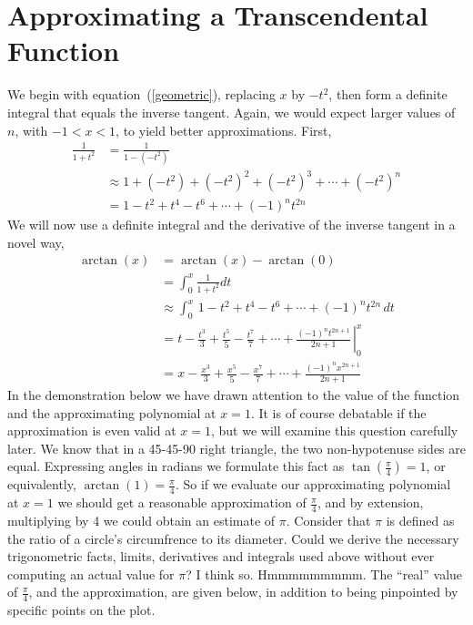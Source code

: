 \documentclass[12pt]{article}
\begin{document}
\section{Approximating a Transcendental Function}
%
We begin with equation~(\ref{geometric}), replacing $x$ by $-t^2$, then form a definite integral that equals the inverse tangent.  Again, we would expect larger values of $n$, with $-1<x<1$, to yield better approximations.  First,
%
\begin{align*}
\frac{1}{1+t^2}
&=\frac{1}{1-(-t^2)}\\
&\approx 1+(-t^2)+(-t^2)^2+(-t^2)^3+\cdots+(-t^2)^n\\
&=1-t^2+t^4-t^6+\cdots+(-1)^{n}t^{2n}
\end{align*}
%
We will now use a definite integral and the derivative of the inverse tangent in a novel way,
%
\begin{align*}
\arctan(x)
&=\arctan(x)-\arctan(0)\\
&=\int_0^x\frac{1}{1+t^2}dt\\
&\approx\int_0^x\,1-t^2+t^4-t^6+\cdots+(-1)^{n}t^{2n}\,dt\\
&=\left.t-\frac{t^3}{3}+\frac{t^5}{5}-\frac{t^7}{7}+\cdots+\frac{(-1)^{n}t^{2n+1}}{2n+1}\,\right\vert_0^x\\
&=x-\frac{x^3}{3}+\frac{x^5}{5}-\frac{x^7}{7}+\cdots+\frac{(-1)^{n}x^{2n+1}}{2n+1}
\end{align*}
%
In the demonstration below we have drawn attention to the value of the function and the approximating polynomial at $x=1$.  It is of course debatable if the approximation is even valid at $x=1$, but we will examine this question carefully later.  We know that in a 45-45-90 right triangle, the two non-hypotenuse sides are equal.  Expressing angles in radians we formulate this fact as $\tan\left(\frac{\pi}{4}\right)=1$, or equivalently, $\arctan(1)=\frac{\pi}{4}$.  So if we evaluate our approximating polynomial at $x=1$ we should get a reasonable approximation of $\frac{\pi}{4}$, and by extension, multiplying by 4 we could obtain an estimate of $\pi$.  Consider that $\pi$ is defined as the ratio of a circle's circumfrence to its diameter.  Could we derive the necessary trigonometric facts, limits, derivatives and integrals used above without ever computing an actual value for $\pi$?  I think so.  Hmmmmmmmmm.  The ``real'' value of $\frac{\pi}{4}$, and the approximation, are given below, in addition to being pinpointed by specific points on the plot.
%
\end{document}

